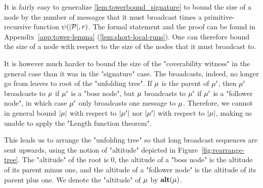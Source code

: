 It is fairly easy to generalize \cref{lem:towerbound_signature} to bound the size of a node by the number of messages that it must broadcast times a primitive-recursive function $\psi(|\mathcal{P}|,r)$. The formal statement and the proof can be found in Appendix~\ref{app:tower-lemma} (\cref{lem:short-local-runs}). 
One can therefore bound the size of a node with respect to the size of the nodes that it must broadcast to.

It is however much harder to bound the size of the "coverability witness" in the general case than it was in the "signature" case. The broadcasts, indeed, no longer go from leaves to root of the "unfolding tree". If $\mu$ is the parent of $\mu'$, then $\mu'$ broadcasts to $\mu$ if $\mu'$ is a "boss node", but $\mu$ broadcasts to $\mu'$ if $\mu'$ is a "follower node", in which case $\mu'$ only broadcasts one message to $\mu$. Therefore, we cannot in general bound $|\mu|$ with respect to $|\mu'|$ nor $|\mu'|$ with respect to $|\mu|$, making us unable to apply the "Length function theorem". 

This leads us to arrange the "unfolding tree" so that long broadcast sequences are sent upwards, using the notion of "altitude" depicted in Figure~\ref{fig:rearrange-tree}. The "altitude" of the root is $0$, the altitude of a "boss node" is the altitude of its parent minus one, and the altitude of a "follower node" is the altitude of its parent plus one.
We denote the "altitude" of $\mu$ by $\mathbf{alt}(\mu)$.




